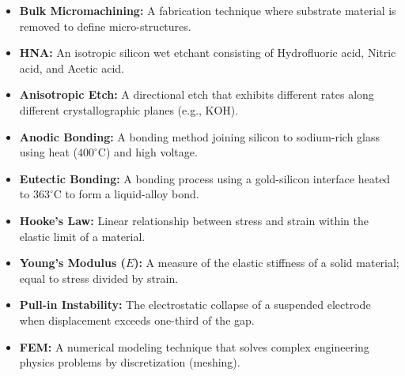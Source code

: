 \documentclass[12pt,a4paper]{article}
\begin{document}
\begin{tcolorbox}[defbox, title={\textbf{One-Line Definitions}}]
\begin{itemize}[leftmargin=*, itemsep=2.5pt, topsep=0pt]
  \item \textbf{Bulk Micromachining:} A fabrication technique where substrate material is removed to define micro-structures.
  \item \textbf{HNA:} An isotropic silicon wet etchant consisting of Hydrofluoric acid, Nitric acid, and Acetic acid.
  \item \textbf{Anisotropic Etch:} A directional etch that exhibits different rates along different crystallographic planes (e.g., KOH).
  \item \textbf{Anodic Bonding:} A bonding method joining silicon to sodium-rich glass using heat ($400^{\circ}\text{C}$) and high voltage.
  \item \textbf{Eutectic Bonding:} A bonding process using a gold-silicon interface heated to $363^{\circ}\text{C}$ to form a liquid-alloy bond.
  \item \textbf{Hooke's Law:} Linear relationship between stress and strain within the elastic limit of a material.
  \item \textbf{Young's Modulus ($E$):} A measure of the elastic stiffness of a solid material; equal to stress divided by strain.
  \item \textbf{Pull-in Instability:} The electrostatic collapse of a suspended electrode when displacement exceeds one-third of the gap.
  \item \textbf{FEM:} A numerical modeling technique that solves complex engineering physics problems by discretization (meshing).
\end{itemize}
\end{tcolorbox}
\end{document}
